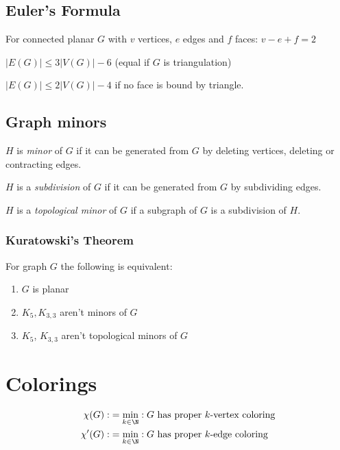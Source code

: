 \subsection*{Euler's Formula}

For connected planar $G$ with $v$ vertices, $e$ edges and $f$ faces: $v-e+f=2$

\spacing

$|E(G)| \leq 3|V(G)|-6$ (equal if $G$ is triangulation)

$|E(G)| \leq 2|V(G)|-4$ if no face is bound by triangle.

\subsection*{Graph minors}

$H$ is \emph{minor} of $G$ if it can be generated from $G$ by deleting vertices, deleting or contracting edges.

\spacing

$H$ is a \emph{subdivision} of $G$ if it can be generated from $G$ by subdividing edges.

\spacing

$H$ is a \emph{topological minor} of $G$ if a subgraph of $G$ is a subdivision of $H$.

\subsubsection*{Kuratowski's Theorem}

For graph $G$ the following is equivalent:

\begin{enumerate}[label=(\alph*)]
	\item $G$ is planar
	\item $K_5, K_{3,3}$ aren't minors of $G$
	\item $K_5$, $K_{3,3}$ aren't topological minors of $G$
\end{enumerate}


\section*{Colorings}

\vspace*{-4mm}
\begin{align*}
\chi(G) :&= \min_{k \in \N} : G \text{ has proper $k$-vertex coloring} \\
\chi'(G) :&= \min_{k \in \N} : G \text{ has proper $k$-edge coloring}
\end{align*}

